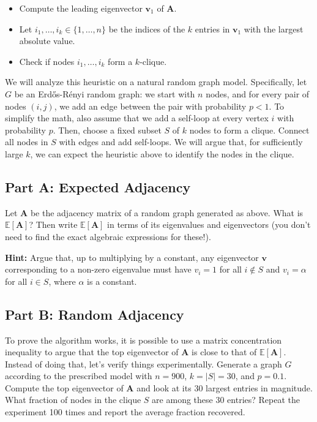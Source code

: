 \documentclass{article}
\begin{document}
\begin{itemize}
\tightlist
\item
  Compute the leading eigenvector \(\mathbf{v}_1\) of \(\mathbf{A}\).
\item
  Let \(i_1, \ldots, i_k \in \{1, \ldots, n\}\) be the indices of the \(k\) entries in \(\mathbf{v}_1\) with the largest absolute value.
\item
  Check if nodes \(i_1, \ldots, i_k\) form a \(k\)-clique.
\end{itemize}

We will analyze this heuristic on a natural random graph model. Specifically, let \(G\) be an Erdős-Rényi random graph: we start with \(n\) nodes, and for every pair of nodes \((i,j)\), we add an edge between the pair with probability \(p < 1\). To simplify the math, also assume that we add a self-loop at every vertex \(i\) with probability \(p\). Then, choose a fixed subset \(S\) of \(k\) nodes to form a clique. Connect all nodes in \(S\) with edges and add self-loops. We will argue that, for sufficiently large \(k\), we can expect the heuristic above to identify the nodes in the clique.

\hypertarget{part-a-expected-adjacency}{%
\subsection*{Part A: Expected Adjacency}\label{part-a-expected-adjacency}}

Let \(\mathbf{A}\) be the adjacency matrix of a random graph generated as above. What is \(\mathbb{E}[\mathbf{A}]\)? Then write \(\mathbb{E}[\mathbf{A}]\) in terms of its eigenvalues and eigenvectors (you don't need to find the exact algebraic expressions for these!).

\textbf{Hint:} Argue that, up to multiplying by a constant, any eigenvector \(\mathbf{v}\) corresponding to a non-zero eigenvalue must have \(v_i = 1\) for all \(i \notin S\) and \(v_i = \alpha\) for all \(i\in S\), where \(\alpha\) is a constant.

\hypertarget{part-b-random-adjacency}{%
\subsection*{Part B: Random Adjacency}\label{part-b-random-adjacency}}

To prove the algorithm works, it is possible to use a matrix concentration inequality to argue that the top eigenvector of \(\mathbf{A}\) is close to that of \(\mathbb{E}[\mathbf{A}]\). Instead of doing that, let's verify things experimentally. Generate a graph \(G\) according to the prescribed model with \(n = 900\), \(k = |S| = 30\), and \(p = 0.1\). Compute the top eigenvector of \(\mathbf{A}\) and look at its 30 largest entries in magnitude. What fraction of nodes in the clique \(S\) are among these 30 entries? Repeat the experiment 100 times and report the average fraction recovered.
\end{document}
